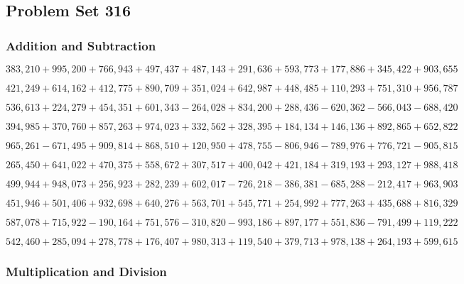 \hypertarget{problem-set-316}{%
\subsection{Problem Set 316}\label{problem-set-316}}

\hypertarget{addition-and-subtraction}{%
\subsubsection{Addition and
Subtraction}\label{addition-and-subtraction}}

\(383,210+995,200+766,943+497,437+487,143+291,636+593,773+177,886+345,422+903,655\)

\(421,249+614,162+412,775+890,709+351,024+642,987+448,485+110,293+751,310+956,787\)

\(536,613+224,279+454,351+601,343-264,028+834,200+288,436-620,362-566,043-688,420\)

\(394,985+370,760+857,263+974,023+332,562+328,395+184,134+146,136+892,865+652,822\)

\(965,261-671,495+909,814+868,510+120,950+478,755-806,946-789,976+776,721-905,815\)

\(265,450+641,022+470,375+558,672+307,517+400,042+421,184+319,193+293,127+988,418\)

\(499,944+948,073+256,923+282,239+602,017-726,218-386,381-685,288-212,417+963,903\)

\(451,946+501,406+932,698+640,276+563,701+545,771+254,992+777,263+435,688+816,329\)

\(587,078+715,922-190,164+751,576-310,820-993,186+897,177+551,836-791,499+119,222\)

\(542,460+285,094+278,778+176,407+980,313+119,540+379,713+978,138+264,193+599,615\)

\hypertarget{multiplication-and-division}{%
\subsubsection{Multiplication and
Division}\label{multiplication-and-division}}

